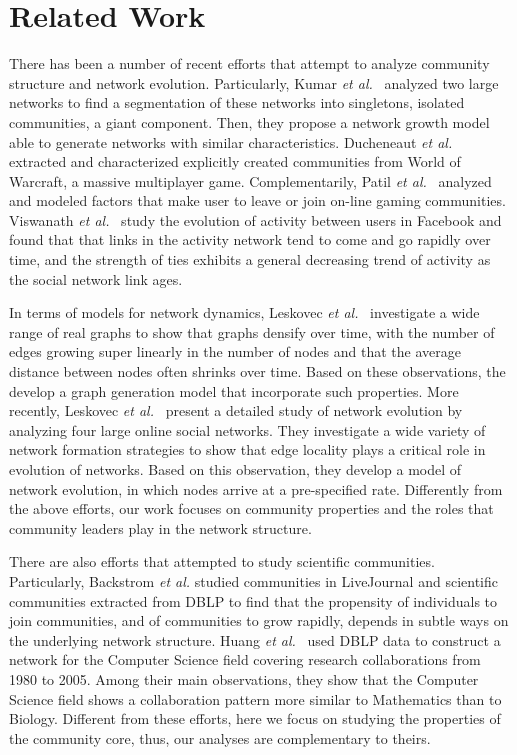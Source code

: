 \section{Related Work}


There has been a number of recent efforts that attempt to analyze community structure and network evolution.  Particularly, Kumar \textit{et al.}~\cite{Kumar:2006} analyzed two large networks to
find a segmentation of these networks into singletons, isolated communities, a giant component. Then, they propose a network growth model able to generate networks with similar
characteristics.  Ducheneaut \textit{et al.}~\cite{Ducheneaut:2007} extracted and characterized explicitly created communities from World of Warcraft, a massive multiplayer game.
Complementarily, Patil \textit{et al.}~\cite{Patil:2012} analyzed and modeled factors that make user to leave or join on-line gaming communities.  Viswanath \textit{et
al.}~\cite{Viswanath:2009} study the evolution of activity between users in Facebook and found that that links in the activity network tend to come and go rapidly over time, and
the strength of ties exhibits a general decreasing trend of activity as the social network link ages.

In terms of models for network dynamics, Leskovec \textit{et al.}~\cite{Leskovec:2005} investigate a wide range of real graphs to show that graphs densify over time, with the
number of edges growing super linearly in the number of nodes and that the average distance between nodes often shrinks over time. Based on these observations, the develop a graph
generation model that incorporate such properties.  More recently, Leskovec \textit{et al.}~\cite{Leskovec:2008} present a detailed study of network evolution by analyzing four
large online social networks.  They investigate a wide variety of network formation strategies to show that edge locality plays a critical role in evolution of networks.  Based on
this observation, they develop a model of network evolution, in which nodes arrive at a pre-specified rate.  Differently from the above efforts, our work focuses on community
properties and the roles that community leaders play in the network structure.

There are also efforts that attempted to study scientific communities. Particularly, Backstrom \textit{et al.}\cite{Backstrom:2006} studied communities in LiveJournal and
scientific communities extracted from DBLP to find that the propensity of individuals to join communities, and of communities to grow rapidly, depends in subtle ways on the
underlying network structure. Huang \textit{et al.}~\cite{Huang:2008} used DBLP data to construct a network for the Computer Science field covering research collaborations from
1980 to 2005.  Among their main observations, they show that the Computer Science field shows a collaboration pattern more similar to Mathematics than to Biology.  
Different from these efforts, here we focus on studying the properties of the community core, thus, our analyses are complementary to
theirs.

